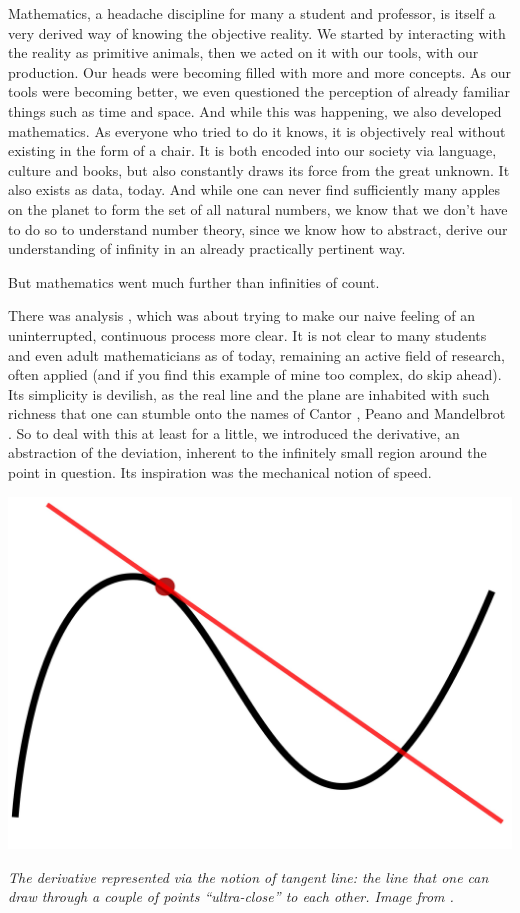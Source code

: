\documentclass{article}
\begin{document}
Mathematics, a headache discipline for many a student and professor, is itself a very derived way of knowing the objective reality. We started by interacting with the reality as primitive animals, then we acted on it with our tools, with our production. Our heads were becoming filled with more and more concepts. As our tools were becoming better, we even questioned the perception of already familiar things such as time and space. And while this was happening, we also developed mathematics. As everyone who tried to do it knows, it is objectively real without existing in the form of a chair. It is both encoded into our society via language, culture and books, but also constantly draws its force from the great unknown. It also exists as data, today. And while one can never find sufficiently many apples on the planet to form the set of all natural numbers, we know that we don’t have to do so to understand number theory, since we know how to abstract, derive our understanding of infinity in an already practically pertinent way.

But mathematics went much further than infinities of count.

There was analysis \cite{ANALYSIS}, which was about trying to make our naive feeling of an uninterrupted, continuous process more clear. It is not clear to many students and even adult mathematicians as of today, remaining an active field of research, often applied (and if you find this example of mine too complex, do skip ahead). Its simplicity is devilish, as the real line and the plane are inhabited with such richness that one can stumble onto the names of Cantor \cite{CANTOR}, Peano \cite{PEANO} and Mandelbrot
\cite{MANDELBROT}. So to deal with this at least for a little, we introduced the derivative, an abstraction of the deviation, inherent to the infinitely small region around the point in question. Its inspiration was the mechanical notion of speed.

\begin{center}
\includegraphics[scale=0.045]{Tangent_to_a_curve.jpg}

\textit{The derivative represented via the notion of tangent line: the line that one can draw through a couple of points ``ultra-close'' to each other. Image from \cite{DERIVATIVE}.}
\end{center}
\end{document}
